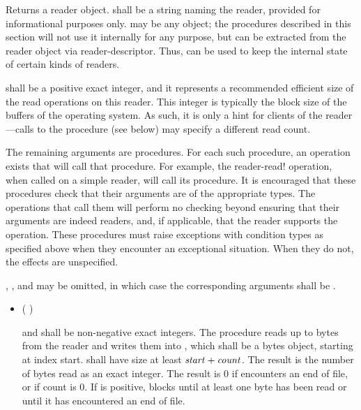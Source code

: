\begin{entry}{%
}

Returns a reader object.  shall be a string naming the reader,
provided for informational purposes only.  may be any
object; the procedures described in this section will not use it internally for any
purpose, but  can be extracted from the reader object via
{\cf reader-descriptor}. Thus,  can be used to keep the
internal state of certain kinds of readers.
   
 shall be a positive exact integer, and it represents a recommended
efficient size of the read operations on this reader. This integer is typically the
block size of the buffers of the operating system. As such, it is only a
hint for clients of the reader---calls to the  procedure (see below)
may specify a different read count.

The remaining arguments are procedures.  For each such procedure, an
operation exists that will call that procedure.  For example, the {\cf
  reader-read!} operation, when called on a simple reader, will call
its  procedure.
It is encouraged that these procedures check that their arguments are
of the appropriate types.  The operations that call them will perform
no checking beyond ensuring that their  arguments are
indeed readers, and, if applicable, that the reader supports the operation.
These procedures must raise
exceptions with condition types as specified above when they encounter an
exceptional situation. When they do not, the effects are unspecified.

, , and  may be
omitted, in which case the corresponding arguments shall be \schfalse.
   
\begin{itemize}
\item {\cf (   )}
       
   and  shall be non-negative exact integers.
  The  procedure
  reads up to  bytes from the reader and writes them
  into , which shall be a bytes object, starting at index
  start.  shall have size at least $\var{start} +
  \var{count}$. The result is the number of bytes read as an
  exact integer. The result is 0 if  encounters an end of file, or if
  count is 0. If  is positive,  blocks until at
  least one byte has been read or until it has encountered an end of file.
  

\end{itemize}
\end{entry}
